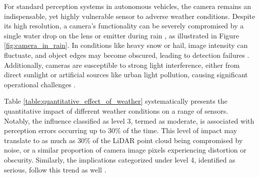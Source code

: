 \documentclass[report.tex]{subfiles}
\begin{document}
    For standard perception systems in autonomous vehicles, the camera remains an indispensable, yet highly vulnerable sensor to adverse weather conditions. Despite its high resolution, a camera's functionality can be severely compromised by a single water drop on the lens or emitter during rain \cite{mardirosian2021LiDAR}, as illustrated in Figure \ref{fig:camera_in_rain}. In conditions like heavy snow or hail, image intensity can fluctuate, and object edges may become obscured, leading to detection failures \cite{zang2019impact}. Additionally, cameras are susceptible to strong light interference, either from direct sunlight or artificial sources like urban light pollution, causing significant operational challenges \cite{acarballo2020libre}.

    Table \ref{table:quantitative_effect_of_weather} systematically presents the quantitative impact of different weather conditions on a range of sensors. Notably, the influence classified as level 3, termed as moderate, is associated with perception errors occurring up to 30\% of the time. This level of impact may translate to as much as 30\% of the LiDAR point cloud being compromised by noise, or a similar proportion of camera image pixels experiencing distortion or obscurity. Similarly, the implications categorized under level 4, identified as serious, follow this trend as well \cite{zhang2023perception}.
\end{document}
